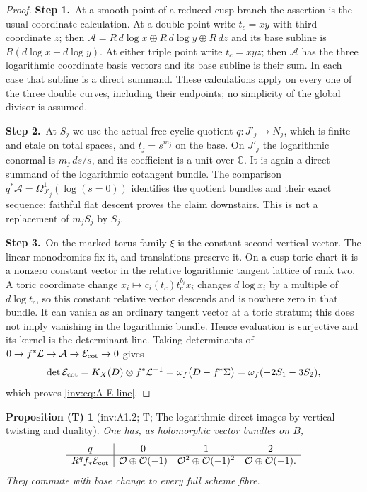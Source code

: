 \documentclass[11pt,a4paper]{article}
\theoremstyle{plain}
\newtheorem{proposition}[theorem]{Proposition (T)}
\theoremstyle{definition}
\newcommand{\uses}[1]{\par\noindent{\small\textsf{Uses:} #1}\par\smallskip}
\begin{document}
\begin{proof}
\par\smallskip\noindent\textbf{Step 1.}\ At a smooth point of a reduced cusp branch the assertion is the usual
coordinate calculation.  At a double point write $t_c=xy$ with third
coordinate $z$; then
$\mathcal A=R\,d\log x\oplus R\,d\log y\oplus R\,dz$ and its
base subline is $R(d\log x+d\log y)$.  At either triple point write
$t_c=xyz$; then $\mathcal A$ has the three logarithmic coordinate
basis vectors and its base subline is their sum.  In each case that
subline is a direct summand.  These calculations apply on every one
of the three double curves, including their endpoints; no simplicity
of the global divisor is assumed.

\par\smallskip\noindent\textbf{Step 2.}\ At $S_j$ we use the actual free cyclic quotient
$q:J'_j\to N_j$, which is finite and etale on total spaces, and
$t_j=s^{m_j}$ on the base.  On $J'_j$ the logarithmic conormal is
$m_j\,ds/s$, and its coefficient is a unit over $\mathbb C$.  It is again a
direct summand of the logarithmic cotangent bundle.  The comparison
$q^*\mathcal A=\Omega_{J'_j}^1(\log(s=0))$ identifies the quotient
bundles and their exact sequence; faithful flat descent proves the
claim downstairs.  This is not a replacement of $m_jS_j$ by $S_j$.

\par\smallskip\noindent\textbf{Step 3.}\ On the marked torus family $\xi$ is the constant second vertical
vector.  The linear monodromies fix it, and translations preserve it.
On a cusp toric chart it is a nonzero constant vector in the relative
logarithmic tangent lattice of rank two.  A toric coordinate change
$x_i\mapsto c_i(t_c)t_c^{b_i}x_i$ changes $d\log x_i$ by a multiple
of $d\log t_c$, so this constant relative vector descends and is
nowhere zero in that bundle.  It can vanish as an ordinary tangent
vector at a toric stratum; this does not imply vanishing in the
logarithmic bundle.  Hence evaluation is surjective and its kernel
is the determinant line.  Taking determinants of
$0\to f^*\mathcal L\to\mathcal A\to\mathcal E_{\rm cot}\to0$ gives
\[
\det\mathcal E_{\rm cot}=K_X(D)\otimes f^*\mathcal L^{-1}
=\omega_f\bigl(D-f^*\Sigma\bigr)
=\omega_f(-2S_1-3S_2),
\]
which proves \eqref{inv:eq:A-E-line}.
\end{proof}

\begin{proposition}[inv:A1.2; T; The logarithmic direct images by vertical twisting and duality]\label{inv:A1.2}
One has, as holomorphic vector bundles on $B$,
\[
\begin{array}{c|ccc}
q&0&1&2\\\hline
R^qf_*\mathcal E_{\rm cot}&\mathcal O\oplus\mathcal O(-1)&
 \mathcal O^2\oplus\mathcal O(-1)^2&\mathcal O\oplus\mathcal O(-1).
\end{array}
\]
They commute with base change to every full scheme fibre.
\end{proposition}
\uses{inv:A1.0, inv:A1.1; analytic duality \cite[pp.~261, 264--266]{RRV71}.}
\end{document}
